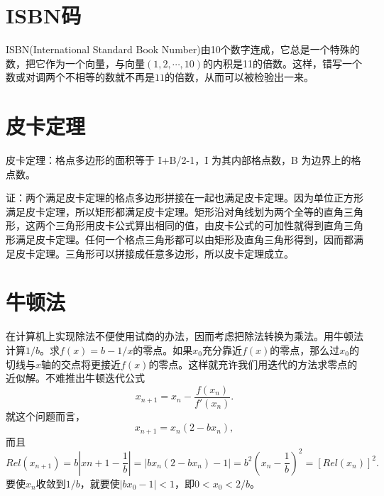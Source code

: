 \documentclass{article}
\begin{document}
\section{ISBN码}
ISBN(International Standard Book Number)由10个数字连成，它总是一个特殊的数，把它作为一个向量，与向量$(1,2,\cdots,10)$的内积是11的倍数。这样，错写一个数或对调两个不相等的数就不再是$11$的倍数，从而可以被检验出一来。
\section{皮卡定理}
\heiti 皮卡定理：\songti 格点多边形的面积等于 I+B/2-1，I 为其内部格点数，B 为边界上的格点数。\par
\heiti 证：\songti 两个满足皮卡定理的格点多边形拼接在一起也满足皮卡定理。因为单位正方形满足皮卡定理，所以矩形都满足皮卡定理。矩形沿对角线划为两个全等的直角三角形，这两个三角形用皮卡公式算出相同的值，由皮卡公式的可加性就得到直角三角形满足皮卡定理。任何一个格点三角形都可以由矩形及直角三角形得到，因而都满足皮卡定理。三角形可以拼接成任意多边形，所以皮卡定理成立。
\section{牛顿法}
在计算机上实现除法不便使用试商的办法，因而考虑把除法转换为乘法。用牛顿法计算$1/b$。求$f(x)= b-1/x$的零点。如果$x_0$充分靠近$f(x)$的零点，那么过$x_0$的切线与$x$轴的交点将更接近$f(x)$的零点。这样就充许我们用迭代的方法求零点的近似解。不难推出牛顿迭代公式$$x_{n+1}=x_n-\frac{f(x_n)}{f'(x_n)}.$$就这个问题而言，$$x_{n+1}=x_n(2-bx_n),$$而且$$Rel(x_{n+1})=b|x{n+1}-\frac1b|=|bx_n(2-bx_n)-1|=b^2(x_n-\frac1b)^2=[Rel(x_n)]^2.$$要使$x_n$收敛到$1/b$，就要使$|bx_0-1|<1$，即$0<x_0<2/b$。
\end{document}

